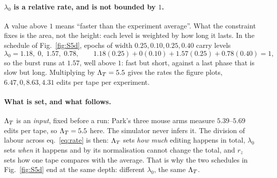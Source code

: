\paragraph{$\lambda_0$ is a relative rate, and is not bounded by $1$.} A value above $1$ means
``faster than the experiment average''. What the constraint fixes is the area, not the height: each
level is weighted by how long it lasts. In the schedule of Fig.~\ref{fig:S5d}, epochs of width
$0.25,0.10,0.25,0.40$ carry levels
\begin{equation}
  \lambda_0 = 1.18,\; 0,\; 1.57,\; 0.78,
  \qquad
  1.18(0.25)+0(0.10)+1.57(0.25)+0.78(0.40) = 1 ,
  \label{eq:lam0norm}
\end{equation}
so the burst runs at $1.57$, well above $1$: fast but short, against a last phase that is slow but
long. Multiplying by $\Lambda_T=5.5$ gives the rates the figure plots, $6.47,0,8.63,4.31$ edits per tape
per experiment.

\paragraph{What is set, and what follows.} $\Lambda_T$ is an \emph{input}, fixed before a run: Park's
three mouse arms measure $5.39$--$5.69$ edits per tape, so $\Lambda_T=5.5$ here. The simulator never
infers it. The division of labour across eq.~\eqref{eq:rate} is then: $\Lambda_T$ sets \emph{how much}
editing happens in total, $\lambda_0$ sets \emph{when} it happens and by its normalisation cannot
change the total, and $r_z$ sets how one tape compares with the average. That is why the two schedules
in Fig.~\ref{fig:S5d} end at the same depth: different $\lambda_0$, the same $\Lambda_T$.

